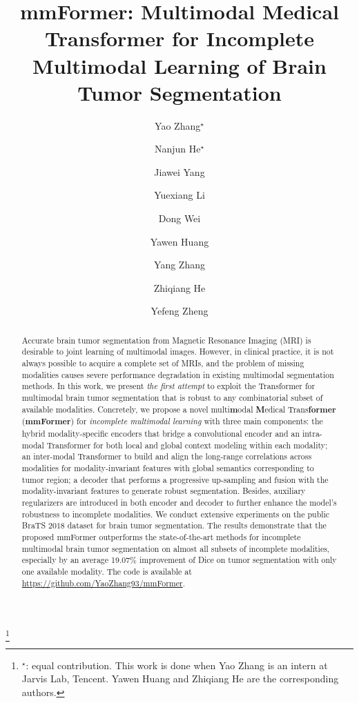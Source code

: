 \documentclass[runningheads]{llncs}
\begin{document}
\title{mmFormer: Multimodal Medical Transformer for Incomplete Multimodal Learning of Brain Tumor Segmentation}
\author{
Yao Zhang$^\star$ \and
Nanjun He$^\star$ \and
Jiawei Yang \and
Yuexiang Li \and
Dong Wei \and
Yawen Huang\Letter \and
Yang Zhang \and
Zhiqiang He\Letter \and
Yefeng Zheng
}
\renewcommand{\thefootnote}{}
\maketitle              

\footnote{$^\star$: equal contribution. This work is done when Yao Zhang is an intern at Jarvis Lab, Tencent. Yawen Huang and Zhiqiang He are the corresponding authors.}

\begin{abstract}
Accurate brain tumor segmentation from Magnetic Resonance Imaging (MRI) is desirable to joint learning of multimodal images. However, in clinical practice, it is not always possible to acquire a complete set of MRIs, and the problem of missing modalities causes severe performance degradation in existing multimodal segmentation methods. In this work, we present \textit{the first attempt} to exploit the Transformer for multimodal brain tumor segmentation that is robust to any combinatorial subset of available modalities. Concretely, we propose a novel multi\textbf{m}odal \textbf{M}edical Trans\textbf{former} (\textbf{mmFormer}) for \textit{incomplete multimodal learning} with three main components: the hybrid modality-specific encoders that bridge a convolutional encoder and an intra-modal Transformer for both local and global context modeling within each modality; an inter-modal Transformer to build and align the long-range correlations across modalities for modality-invariant features with global semantics corresponding to tumor region; a decoder that performs a progressive up-sampling and fusion with the modality-invariant features to generate robust segmentation. Besides, auxiliary regularizers are introduced in both encoder and decoder to further enhance the model's robustness to incomplete modalities. We conduct extensive experiments on the public BraTS $2018$ dataset for brain tumor segmentation. The results demonstrate that the proposed mmFormer outperforms the state-of-the-art methods for incomplete multimodal brain tumor segmentation on almost all subsets of incomplete modalities, especially by an average 19.07\% improvement of Dice on tumor segmentation with only one available modality. The code is available at \href{https://github.com/YaoZhang93/mmFormer}{https://github.com/YaoZhang93/mmFormer}.

\end{abstract}
\end{document}
